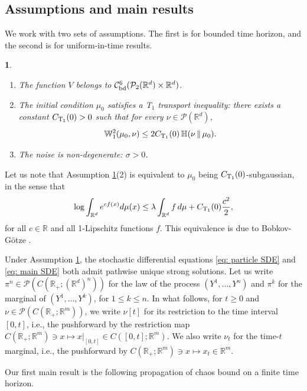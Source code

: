 \documentclass[11pt,reqno]{amsart}
\makeatletter
\numberwithin{equation}{section}
\newtheorem*{assumption*}{\assumptionnumber}
\providecommand{\assumptionnumber}{}
\newenvironment{assumption}[1]
 {%
  \renewcommand{\assumptionnumber}{Assumption #1}%
  \begin{assumption*}%
  \protected@edef\@currentlabel{\textbf{\textup {#1}}}%
 }
 {%
  \end{assumption*}
 }
\theoremstyle{definition}
\def\R{{\mathbb R}}
\newcommand{\W}{\mathbb W}
\newcommand{\ent}{ \mathbb H}
\makeatother
\begin{document}
\subsection{Assumptions and main results}

We work with two sets of assumptions. The first is for bounded time horizon, and the second is for uniform-in-time results.

\begin{assumption}{($A$)} { \ }
\begin{enumerate}
\item The function $V$ belongs to $\mathcal C_{\textup{bd}}^6(\mathcal P_2(\R^d)\times \R^d)$. 
\item The initial condition $\mu_0$ satisfies a T$_1$ transport inequality: there exists a constant $C_{\textup{T}_1}(0)> 0$ such that for every $\nu \in \mathcal P(\R^d)$,
\[\W_1^2(\mu_0,\nu)\leq 2C_{\textup{T}_1}(0) \,\ent (\nu\,\|\,\mu_0). \]
\item The noise is non-degenerate: $\sigma>0$.
\end{enumerate}
\label{assumption on Phi}
\end{assumption}

Let us note that Assumption \ref{assumption on Phi}(2) is equivalent to $\mu_0$ being $C_{\textup{T}_1}(0)$-subgaussian, in the sense that
\begin{equation}
\log \int_{\R^d} e^{c f(x)}d\mu(x) \le \lambda \int_{\R^d} f\,d\mu + C_{\textup{T}_1}(0)\frac{c^2}{2}, \label{ineq:mu_0subgaussian}
\end{equation}
for all $c \in \R$ and all 1-Lipschitz functions $f$. This equivalence is due to  Bobkov-G\"otze \cite[Theorem 4.8]{VanHandelHDP}.

Under Assumption \ref{assumption on Phi}, the stochastic differential equations \eqref{eq: particle SDE} and \eqref{eq: main SDE} both admit pathwise unique strong solutions. Let us write $\pi^n \in \mathcal P(C(\R_+;(\R^{d})^{n}))$ for the law of the process $(Y^1,\ldots,Y^n)$ and $\pi^k$ for the marginal of $(Y^1,\ldots,Y^k)$, for $1 \le k \le n$. 
In what follows, for $t \ge 0$ and $\nu \in \mathcal P( C(\R_+;\R^m))$, we write $\nu[t]$ for its restriction to the time interval $[0,t]$, i.e., the pushforward by the restriction map $C(\R_+;\R^m) \ni x\mapsto x|_{[0,t]} \in C([0,t];\R^m)$.
We also write $\nu_t$ for the time-$t$ marginal, i.e., the pushforward by $C(\R_+;\R^m) \ni x\mapsto x_t \in \R^m$.


Our first main result is the following propagation of chaos bound on a finite time horizon.
\end{document}
